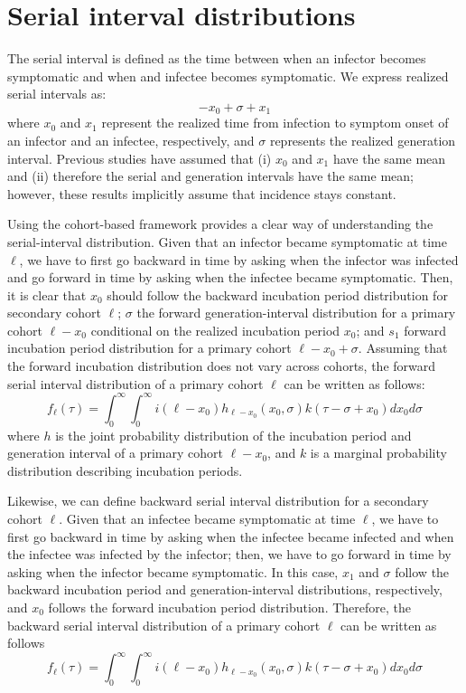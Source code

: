 \documentclass[12pt]{article}
\begin{document}
\section{Serial interval distributions}

The serial interval is defined as the time between when an infector becomes symptomatic and when and infectee becomes symptomatic.
We express realized serial intervals as:
\begin{equation}
- x_0 + \sigma + x_1
\end{equation}
where $x_0$ and $x_1$ represent the realized time from infection to symptom onset of an infector and an infectee, respectively, and $\sigma$ represents the realized generation interval.
Previous studies have assumed that (i) $x_0$ and $x_1$ have the same mean and (ii) therefore the serial and generation intervals have the same mean;
however, these results implicitly assume that incidence stays constant.

Using the cohort-based framework provides a clear way of understanding the serial-interval distribution.
Given that an infector became symptomatic at time $\ell$, we have to first go backward in time by asking when the infector was infected and go forward in time by asking when the infectee became symptomatic.
Then, it is clear that $x_0$ should follow the backward incubation period distribution for secondary cohort $\ell$; 
$\sigma$ the forward generation-interval distribution for a primary cohort $\ell - x_0$ conditional on the realized incubation period $x_0$;
and $s_1$ forward incubation period distribution for a primary cohort $\ell - x_0 + \sigma$.
Assuming that the forward incubation distribution does not vary across cohorts, the forward serial interval distribution of a primary cohort $\ell$ can be written as follows:
\begin{equation}
f_\ell(\tau) = \int_{0}^\infty \int_{0}^\infty i(\ell - x_0) h_{\ell - x_0}(x_0, \sigma) k(\tau-\sigma+x_0) d x_0 d\sigma
\end{equation}
where $h$ is the joint probability distribution of the incubation period and generation interval of a primary cohort $\ell - x_0$, and $k$ is a marginal probability distribution describing incubation periods.

Likewise, we can define backward serial interval distribution for a secondary cohort $\ell$.
Given that an infectee became symptomatic at time $\ell$, we have to first go backward in time by asking when the infectee became infected and when the infectee was infected by the infector; 
then, we have to go forward in time by asking when the infector became symptomatic.
In this case, $x_1$ and $\sigma$ follow the backward incubation period and generation-interval distributions, respectively, and $x_0$ follows the forward incubation period distribution.
Therefore, the backward serial interval distribution of a primary cohort $\ell$ can be written as follows
\begin{equation}
f_\ell(\tau) = \int_{0}^\infty \int_{0}^\infty i(\ell - x_0) h_{\ell - x_0}(x_0, \sigma) k(\tau-\sigma+x_0) d x_0 d\sigma
\end{equation}



\end{document}
